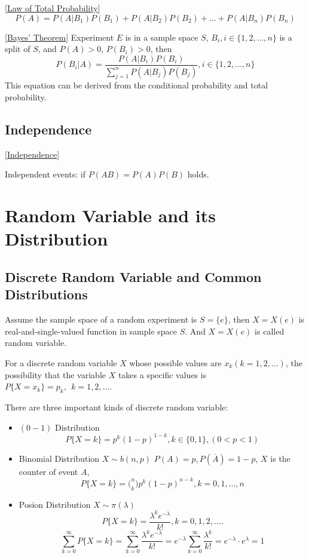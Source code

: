 [\href{https://en.wikipedia.org/wiki/Law_of_total_probability}{Law of Total Probability}]
$$ P(A) = P(A|B_1)P(B_1) + P(A|B_2)P(B_2) + \ldots + P(A|B_n)P(B_n) $$

[\href{https://en.wikipedia.org/wiki/Bayes\%27_theorem}{Bayes' Theorem}]
Experiment $E$ is in a sample space $S$, $B_i, i\in\{1,2,\ldots,n\}$ is
a split of $S$, and $P(A)>0$, $P(B_i)>0$, then
$$ P(B_i|A) = \frac{P(A|B_i)P(B_i)}{\sum\limits_{j=1}^n P(A|B_j)P(B_j)} , i \in \{1,2,\ldots, n\}$$
This equation can be derived from the conditional probability and total
probability.

\subsection{Independence}

[\href{https://en.wikipedia.org/wiki/Independence_(probability_theory)}{Independence}]

Independent events: if $P(AB) = P(A)P(B)$ holds.

\section{Random Variable and its Distribution}

\subsection{Discrete Random Variable and Common Distributions}

Assume the sample space of a random experiment is $S = \{e\}$, then
$X=X(e)$ is real-and-single-valued function in sample space $S$.
And $X=X(e)$ is called random variable.

For a discrete random variable $X$ whose possible values are
$x_k (k=1,2,\ldots)$, the possibility that the variable $X$ takes
a specific values is $ P\{X=x_k\} = p_k, ~~ k = 1, 2, \ldots$.

There are three important kinds of discrete random variable:
\begin{itemize}
\item $(0-1)$ Distribution\newline
  $$P\{X=k\} = p^k(1-p)^{1-k} , k \in \{ 0, 1 \}, (0<p<1) $$
\item Binomial Distribution $X\sim b(n,p)$\newline
  $P(A) = p, P(\overline A) = 1-p$, $X$ is the counter of event $A$,
		$$P\{X=k\} = \big(_k^n\big) p^k (1-p)^{n-k} , k = 0,1,\ldots, n$$
\item Posion Distribution $X\sim \pi(\lambda)$\newline
  $$ P\{X=k\} = \frac{\lambda^k e^{-\lambda}}{k!}, k = 0,1,2,\ldots. $$
  $$ \sum_{k=0}^\infty P\{X=k\} = \sum_{k=0}^\infty \frac{\lambda^k e^{-\lambda}}{k!} 
     = e^{-\lambda} \sum_{k=0}^\infty \frac{\lambda^k}{k!} = e^{-\lambda} \cdot e^\lambda = 1$$
\end{itemize}

